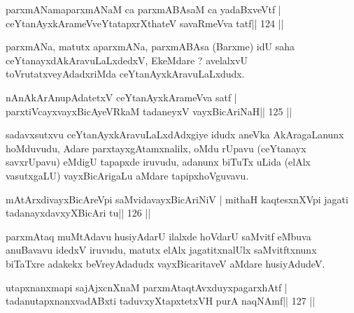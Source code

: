 \begin{shl}
parxmANamaparxmANaM ca parxmABAsaM ca yadaBxveVtf |
ceYtanAyxkArameVveYtatapxrXthateV savaRmeVva tatf\hfill || 124 ||
\end{shl}

\begin{artha}
parxmANa, matutx aparxmANa, parxmABAsa (Barxme) idU saha ceYtanayxdAkAra\-vuLaLxdedxV, EkeMdare ? avelalxvU toVrutatxveyAdadxriMda ceYtanAyxkAravuLaLxdudx.
\end{artha}


\begin{shl}
nAnAkArAnupAdatetxV ceYtanAyxkArameVva satf |
parxtiVcayxvayxBicAyeVRkaM tadaneyxV vayxBicAriNaH\hfill || 125 ||
\end{shl}

\begin{artha}
sadavxsutxvu ceYtanAyxkAravuLaLxdAdxgiye idudx aneVka AkAragaLanunx hoMduvudu, Adare parxtayxgAtamxnalilx, oMdu rUpavu (ceYtanayx savxrUpavu) eMdigU tapapxde iru\-vudu, adanunx biTuTx uLida (elAlx vasutxgaLU) vayxBicArigaLu aMdare tapipxhoVgu\-vavu.
\end{artha}

\begin{shl}
\footnotemark[1]mAtArxdivayxBicAreV\s pi saMvidavayxBicAriNiV |
\footnotemark[2]mithaH kaqtesxnXV\s pi jagati tadanayxdavxyXBicAri tu\hfill || 126 ||
\end{shl}

\begin{artha}
parxmAtaq muMtAdavu husiyAdarU ilalxde hoVdarU saMvitf eMbuva anuBavavu idedxV iruvudu, matutx elAlx jagatitxnalUlx saMvitftxnunx biTaTxre adakekx beVreyAdadudx vayxBicaritaveV aMdare husiyAdudeV.
\end{artha}

\begin{shl}
\footnotemark[3]utapxnanxmapi sajAjxcnXnaM parxmAtaqtAvxduyxpagarxhAtf |
\footnotemark[4]tadanutapxnanxvadABxti taduvxyXtapxtetxVH purA naqNAmf\hfill || 127 ||
\end{shl}

